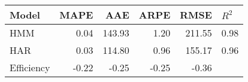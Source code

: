 \begin{tabular}{lrrrrl}
\toprule
Model & MAPE & AAE & ARPE & RMSE & $R^2$ \\
\midrule
HMM & 0.04 & 143.93 & 1.20 & 211.55 & 0.98 \\
HAR & 0.03 & 114.80 & 0.96 & 155.17 & 0.96 \\
Efficiency & -0.22 & -0.25 & -0.25 & -0.36 &  \\
\bottomrule
\end{tabular}
